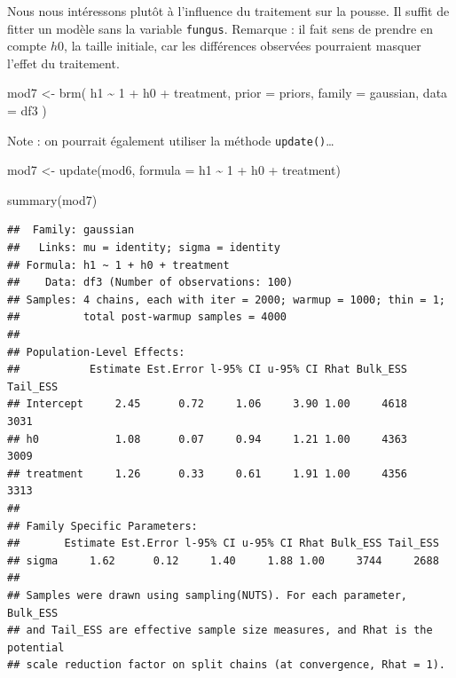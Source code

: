 \documentclass[
  a4paper,11pt,twoside,onecolumn,openright,final,oldfontcommands]{memoir}
\newenvironment{Shaded}{\begin{snugshade}}{\end{snugshade}}
\newcommand{\AttributeTok}[1]{\textcolor[rgb]{0.77,0.63,0.00}{#1}}
\newcommand{\DecValTok}[1]{\textcolor[rgb]{0.00,0.00,0.81}{#1}}
\newcommand{\FunctionTok}[1]{\textcolor[rgb]{0.00,0.00,0.00}{#1}}
\newcommand{\NormalTok}[1]{#1}
\newcommand{\OtherTok}[1]{\textcolor[rgb]{0.56,0.35,0.01}{#1}}
\newcommand{\SpecialCharTok}[1]{\textcolor[rgb]{0.00,0.00,0.00}{#1}}
\theoremstyle{definition}
\theoremstyle{definition}
\theoremstyle{definition}
\theoremstyle{remark}
\begin{document}
Nous nous intéressons plutôt à l'influence du traitement sur la pousse. Il suffit de fitter un modèle sans la variable \texttt{fungus}. Remarque : il fait sens de prendre en compte \(h0\), la taille initiale, car les différences observées pourraient masquer l'effet du traitement.

\begin{Shaded}
\begin{Highlighting}[]
\NormalTok{mod7 }\OtherTok{\textless{}{-}} \FunctionTok{brm}\NormalTok{(}
\NormalTok{  h1 }\SpecialCharTok{\textasciitilde{}} \DecValTok{1} \SpecialCharTok{+}\NormalTok{ h0 }\SpecialCharTok{+}\NormalTok{ treatment,}
  \AttributeTok{prior =}\NormalTok{ priors,}
  \AttributeTok{family =}\NormalTok{ gaussian,}
  \AttributeTok{data =}\NormalTok{ df3}
\NormalTok{  )}
\end{Highlighting}
\end{Shaded}

Note : on pourrait également utiliser la méthode \texttt{update()}\ldots{}

\begin{Shaded}
\begin{Highlighting}[]
\NormalTok{mod7 }\OtherTok{\textless{}{-}} \FunctionTok{update}\NormalTok{(mod6, }\AttributeTok{formula =}\NormalTok{ h1 }\SpecialCharTok{\textasciitilde{}} \DecValTok{1} \SpecialCharTok{+}\NormalTok{ h0 }\SpecialCharTok{+}\NormalTok{ treatment)}
\end{Highlighting}
\end{Shaded}

\begin{Shaded}
\begin{Highlighting}[]
\FunctionTok{summary}\NormalTok{(mod7)}
\end{Highlighting}
\end{Shaded}

\begin{verbatim}
##  Family: gaussian 
##   Links: mu = identity; sigma = identity 
## Formula: h1 ~ 1 + h0 + treatment 
##    Data: df3 (Number of observations: 100) 
## Samples: 4 chains, each with iter = 2000; warmup = 1000; thin = 1;
##          total post-warmup samples = 4000
## 
## Population-Level Effects: 
##           Estimate Est.Error l-95% CI u-95% CI Rhat Bulk_ESS Tail_ESS
## Intercept     2.45      0.72     1.06     3.90 1.00     4618     3031
## h0            1.08      0.07     0.94     1.21 1.00     4363     3009
## treatment     1.26      0.33     0.61     1.91 1.00     4356     3313
## 
## Family Specific Parameters: 
##       Estimate Est.Error l-95% CI u-95% CI Rhat Bulk_ESS Tail_ESS
## sigma     1.62      0.12     1.40     1.88 1.00     3744     2688
## 
## Samples were drawn using sampling(NUTS). For each parameter, Bulk_ESS
## and Tail_ESS are effective sample size measures, and Rhat is the potential
## scale reduction factor on split chains (at convergence, Rhat = 1).
\end{verbatim}
\end{document}
